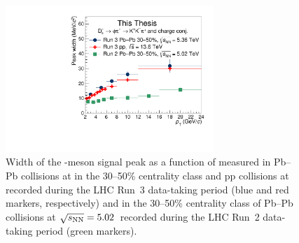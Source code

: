\begin{figure}
    \centering
    \includegraphics[width=0.7\textwidth]{Figures/Chapter 8/Ds_widths_performance.pdf}
    \caption{Width of the \ds-meson signal peak as a function of \pt measured in \mbox{Pb--Pb} collisions at \fivenn in the 30--50\% centrality class and pp collisions at \thirteen recorded during the LHC Run~3 data-taking period  (blue and red markers, respectively) and in the 30--50\% centrality class of Pb--Pb collisions at $\sqrt{s_\mathrm{NN}}=5.02$~\tev recorded during the LHC Run~2 data-taking period (green markers).}
    \label{fig:inv_mass_fit_res_pbpb}
\end{figure}
